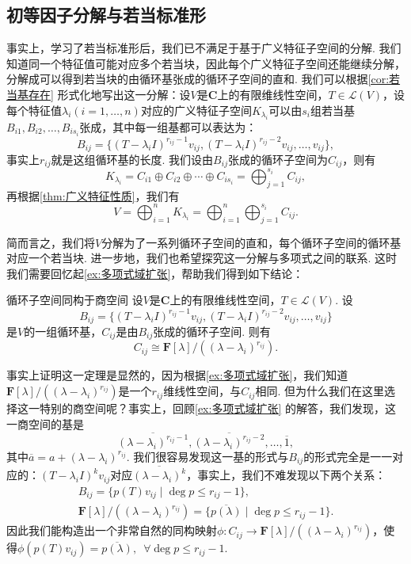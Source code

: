 \subsection{初等因子分解与若当标准形}

事实上，学习了若当标准形后，我们已不满足于基于广义特征子空间的分解. 我们知道同一个特征值可能对应多个若当块，因此每个广义特征子空间还能继续分解，分解成可以得到若当块的由循环基张成的循环子空间的直和. 我们可以根据\autoref{cor:若当基存在} 形式化地写出这一分解：设$V$是$\mathbf{C}$上的有限维线性空间，$T\in\mathcal{L}(V)$，设每个特征值$\lambda_i(i=1,\ldots,n)$对应的广义特征子空间$K_{\lambda_i}$可以由$s_i$组若当基$B_{i1},B_{i2},\ldots,B_{is_i}$张成，其中每一组基都可以表达为：
\[B_{ij}=\{(T-\lambda_iI)^{r_{ij}-1}v_{ij},(T-\lambda_iI)^{r_{ij}-2}v_{ij},\ldots,v_{ij}\},\]
事实上$r_{ij}$就是这组循环基的长度. 我们设由$B_{ij}$张成的循环子空间为$C_{ij}$，则有
\[K_{\lambda_i}=C_{i1}\oplus C_{i2}\oplus\cdots\oplus C_{is_i}=\bigoplus_{j=1}^{s_i} C_{ij},\]
再根据\autoref{thm:广义特征性质}，我们有
\begin{equation} \label{eq:19:循环子空间分解}
    V=\bigoplus_{i=1}^n K_{\lambda_i}=\bigoplus_{i=1}^n\bigoplus_{j=1}^{s_i} C_{ij}.
\end{equation}

简而言之，我们将$V$分解为了一系列循环子空间的直和，每个循环子空间的循环基对应一个若当块. 进一步地，我们也希望探究这一分解与多项式之间的联系. 这时我们需要回忆起\autoref{ex:多项式域扩张}，帮助我们得到如下结论：
\begin{theorem}{}{循环子空间同构于商空间}
    设$V$是$\mathbf{C}$上的有限维线性空间，$T\in\mathcal{L}(V)$. 设
    \[B_{ij}=\{(T-\lambda_iI)^{r_{ij}-1}v_{ij},(T-\lambda_iI)^{r_{ij}-2}v_{ij},\ldots,v_{ij}\}\]
    是$V$的一组循环基，$C_{ij}$是由$B_{ij}$张成的循环子空间. 则有
    \[C_{ij}\cong \mathbf{F}[\lambda]/((\lambda-\lambda_i)^{r_{ij}}).\]
\end{theorem}

事实上证明这一定理是显然的，因为根据\autoref{ex:多项式域扩张}，我们知道$\mathbf{F}[\lambda]/((\lambda-\lambda_i)^{r_{ij}})$是一个$r_{ij}$维线性空间，与$C_{ij}$相同. 但为什么我们在这里选择这一特别的商空间呢？事实上，回顾\autoref{ex:多项式域扩张} 的解答，我们发现，这一商空间的基是
\[\overline{(\lambda-\lambda_i)^{r_{ij}-1}},\overline{(\lambda-\lambda_i)^{r_{ij}-2}},\ldots,\overline{1},\]
其中$\overline{a}=a+(\lambda-\lambda_i)^{r_{ij}}$. 我们很容易发现这一基的形式与$B_{ij}$的形式完全是一一对应的：$(T-\lambda_iI)^kv_{ij}$对应$\overline{(\lambda-\lambda_i)^k}$，事实上，我们不难发现以下两个关系：
\begin{gather*}
    B_{ij}=\{p(T)v_{ij}\mid \deg p\leqslant r_{ij}-1\},\\
    \mathbf{F}[\lambda]/((\lambda-\lambda_i)^{r_{ij}})=\{\overline{p(\lambda)}\mid \deg p\leqslant r_{ij}-1\}.
\end{gather*}
因此我们能构造出一个非常自然的同构映射$\phi:C_{ij}\to \mathbf{F}[\lambda]/((\lambda-\lambda_i)^{r_{ij}})$，使得$\phi(p(T)v_{ij})=\overline{p(\lambda)},\enspace\forall \deg p\leqslant r_{ij}-1$.

